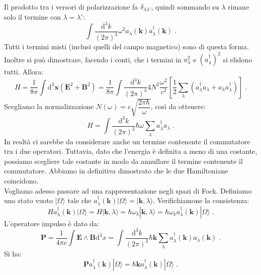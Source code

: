 \documentclass[10pt,a4paper]{report}
\theoremstyle{definition}
\numberwithin{equation}{section}
\newcommand{\diff}[1][]{\mathrm{d}#1}
\newcommand{\ket}{\rangle}
\newcommand{\adj}[1]{#1^{\dagger}}
\begin{document}
Il prodotto tra i versori di polarizzazione fa $\delta_{\lambda\lambda'}$, quindi sommando su $\lambda$ rimane solo il termine con $\lambda=\lambda'$:
\begin{equation}
\int \frac{\diff^3{k}}{(2\pi)^3}\omega^2 a_{\lambda}(\mathbf{k})\adj{a_{\lambda}}(\mathbf{k})\;.
\end{equation}
Tutti i termini misti (inclusi quelli del campo magnetico) sono di questa forma. Inoltre si può dimostrare, facendo i conti, che i termini in $a_{\lambda}^2$ e $(\adj{a_{\lambda}})^2$ si elidono tutti. Allora:
\begin{equation}
H=\frac{1}{8\pi}\int\diff^3{\mathbf{x}}(\mathbf{E}^2+\mathbf{B}^2)=\frac{1}{8\pi}\int\frac{\diff^3{k}}{(2\pi)^3}4N^2\frac{\omega^2}{c^2}\left[\frac{1}{2}\sum_{\lambda}(\adj{a_{\lambda}}a_{\lambda}+a_{\lambda}\adj{a_{\lambda}})\right]\;.
\end{equation}
Scegliamo la normalizzazione $N(\omega)=c\sqrt{\dfrac{2\pi\hbar}{\omega}}$, così da ottenere:
\begin{equation}
H=\int\frac{\diff^3{k}}{(2\pi)^3}\hbar\omega\sum_{\lambda}\adj{a_{\lambda}}a_{\lambda}\;.
\end{equation}
In realtà ci sarebbe da considerare anche un termine contenente il commutatore tra i due operatori. Tuttavia, dato che l'energia è definita a meno di una costante, possiamo scegliere tale costante in modo da annullare il termine contenente il commutatore. Abbiamo in definitiva dimostrato che le due Hamiltoniane coincidono. \\
Vogliamo adesso passare ad una rappresentazione negli spazi di Fock. Definiamo uno stato vuoto $|\Omega\ket$ tale che $\adj{a_{\lambda}}(\mathbf{k})|\Omega\ket=|\mathbf{k},\lambda\ket$. Verifichiamone la consistenza:
\begin{equation}
H\adj{a_{\lambda}}(\mathbf{k})|\Omega\ket=H|\mathbf{k},\lambda\ket=\hbar\omega_k |\mathbf{k},\lambda\ket=
\hbar\omega_k\adj{a_{\lambda}}(\mathbf{k})|\Omega\ket\;.
\end{equation}
L'operatore impulso è dato da:
\begin{equation}
\mathbf{P}=\frac{1}{4\pi c}\int\mathbf{E}\wedge\mathbf{B}\diff^3{x}=\int\frac{\diff^3{k}}{(2\pi)^3}\hbar\mathbf{k}\sum_{\lambda}\adj{a_{\lambda}}(\mathbf{k})a_{\lambda}(\mathbf{k})\;.
\end{equation}
Si ha:
\begin{equation}
\mathbf{P}\adj{a_{\lambda}}(\mathbf{k})|\Omega\ket=\hbar\mathbf{k}\adj{a_{\lambda}}(\mathbf{k})|\Omega\ket\;.
\end{equation}
\end{document}
